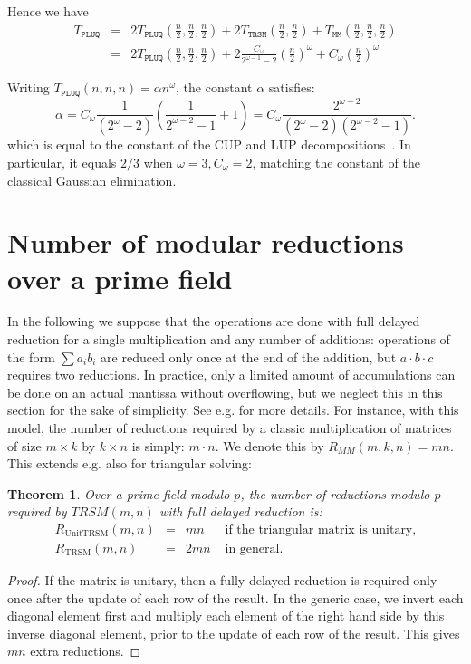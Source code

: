 \documentclass{article}
\newcommand{\customvspace}[1]{}
\newcommand{\pluq}{\texttt{PLUQ}\xspace}
\newcommand{\trsm}{\texttt{TRSM}\xspace}
\newcommand{\MM}{\texttt{MM}\xspace}
\newcommand{\nn}{\frac{n}{2}}
\newtheorem{theorem}{Theorem}
\begin{document}
Hence we have
\begin{eqnarray*}
  T_\pluq &=& 2T_\pluq(\nn,\nn,\nn) + 2T_\trsm(\nn,\nn)+ T_\MM(\nn,\nn,\nn)\\
         &=&  2T_\pluq(\nn,\nn,\nn) +
  2\frac{C_\omega}{2^{\omega-1}-2}\left(\nn\right)^\omega + C_\omega\left(\nn\right)^\omega
\end{eqnarray*}

Writing $T_\pluq(n,n,n) = \alpha n^\omega$, the constant $\alpha$ satisfies:   
$$
\alpha=C_\omega\frac{1}{(2^{\omega}-2)}\left(\frac{1}{2^{\omega-2}-1}+1\right) = C_\omega\frac{2^{\omega-2}}{(2^{\omega}-2)(2^{\omega-2}-1)}.
$$
which is equal to the constant of the CUP and LUP decompositions~\cite[Table
  1]{JPS:2011}. In particular, 
it equals $2/3$ when $\omega=3, C_\omega=2$, matching the constant of the classical
Gaussian elimination.


 \section{Number of modular reductions over a prime field}
\label{sec:mod}

In the following we suppose that the operations are done with full
delayed reduction for a single multiplication and any number of
additions: operations of the form $\sum a_i b_i$ are reduced only once
at the end of the addition, but $a \cdot b \cdot c$ requires two
reductions.
In practice, only a limited amount of accumulations can be done on an
actual mantissa without overflowing, but we neglect this in this
section for the sake of simplicity. 
See e.g. \cite{jgd:2008:toms} for more details. 
For instance, with this model, the number of reductions required by a
classic multiplication of matrices of size $m\times k$ by $k\times n$
is simply: $m\cdot n$. We denote this by $R_{MM}(m,k,n)=mn$.
This extends e.g. also for triangular solving:

\begin{theorem}\label{thm:trsm}
Over a prime field modulo $p$, the number of reductions modulo $p$ required by
$TRSM(m,n)$ with full delayed reduction is:
$$
\begin{array}{lcll}
R_\text{UnitTRSM}(m,n)&=&mn& \text{ if the triangular matrix is
  unitary,}\\
R_\text{TRSM}(m,n)&=&2mn& \text{ in general.}
\end{array}
$$
\customvspace{-5pt}
\end{theorem}
\begin{proof} 
If the matrix is unitary, then a fully delayed reduction is required
only once after the update of each row of the result.
In the generic case, we invert each diagonal element first and
multiply each element of the right hand side by this inverse diagonal
element, prior to the update of each row of the result. This gives
$mn$ extra reductions. 
\end{proof}
\end{document}
